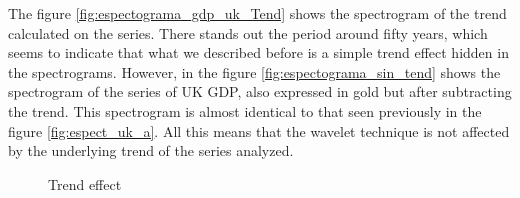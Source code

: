 \documentclass[a4paper]{article}
\begin{document}
	The figure \ref{fig:espectograma_gdp_uk_Tend} shows the spectrogram of the trend calculated on the series. There stands out the period around fifty years, which seems to indicate that what we described before is a simple trend effect hidden in the spectrograms. However, in the figure \ref{fig:espectograma_sin_tend} shows the spectrogram of the series of UK GDP, also expressed in gold but after subtracting the trend. This spectrogram is almost identical to that seen previously in the figure \ref{fig:espect_uk_a}. All this means that the wavelet technique is not affected by the underlying trend of the series analyzed.
	
	\begin{figure}[H]
		\centering
		\caption{Trend effect} \label{fig:espect_tendencias}
		
	\end{figure}
	
\end{document}
